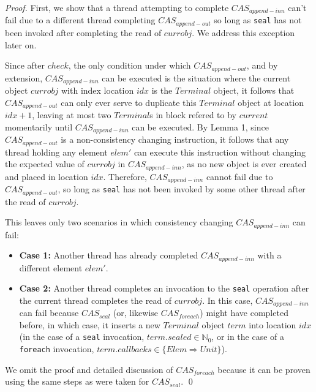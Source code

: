 \documentclass[runningheads,a4paper]{llncs}
\begin{document}
\begin{proof}
First, we show that a thread attempting to complete $CAS_{append-inn}$ can't fail due to a
different thread completing $CAS_{append-out}$ so long as \verb=seal= has not been invoked
after completing the read of $currobj$. We address this exception later on.

Since after $check$, the only condition under which $CAS_{append-out}$, and by
extension, $CAS_{append-inn}$ can be executed is the situation where the
current object $currobj$ with index location $idx$ is the $Terminal$ object,
it follows that $CAS_{append-out}$ can only ever serve to duplicate this
$Terminal$ object at location $idx+1$, leaving at most two $Terminal$s in
block refered to by $current$ momentarily until $CAS_{append-inn}$ can be
executed. By Lemma 1, since $CAS_{append-out}$ is a non-consistency changing
instruction, it follows that any thread holding any element $elem'$ can
execute this instruction without changing the expected value of $currobj$ in
$CAS_{append-inn}$, as no new object is ever created and placed in location
$idx$. Therefore, $CAS_{append-inn}$ cannot fail due to $CAS_{append-out}$, so
long as \verb=seal= has not been invoked by some other thread after the read
of $currobj$.

This leaves only two scenarios in which consistency changing 
$CAS_{append-inn}$ can fail:

\begin{itemize}
\item \textbf{Case 1:} Another thread has already completed $CAS_{append-inn}$ with a 
different element $elem'$.
\item \textbf{Case 2:} Another thread completes an invocation to the \verb=seal= 
operation after the current thread completes the read of $currobj$. In this 
case, $CAS_{append-inn}$ can fail because $CAS_{seal}$ (or, likewise $CAS_{foreach}$) 
might have completed before, in which case, it inserts a new $Terminal$ object $term$ 
into location $idx$ (in the case of a \verb=seal= invocation, 
$term.sealed\in\mathbb{N}_0$, or in the case of a \verb=foreach= invocation, 
$term.callbacks\in\{Elem \Rightarrow Unit\}$). 
\end{itemize}

We omit the proof and detailed discussion of $CAS_{foreach}$ because it can be proven 
using the same steps as were taken for $CAS_{seal}$. 
\qed
\end{proof}

\end{document}
